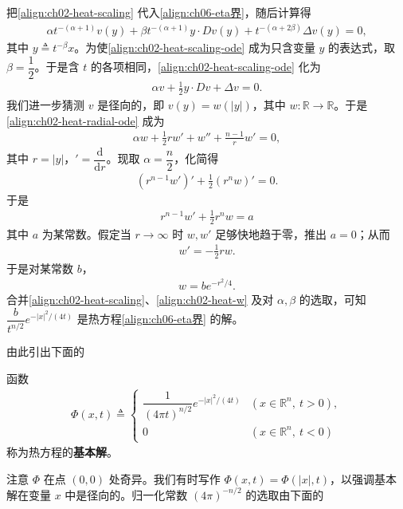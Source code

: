 \documentclass[../../main.tex]{subfiles}
\begin{document}
把\eqref{align:ch02-heat-scaling} 代入\eqref{align:ch06-eta界}，随后计算得
\begin{align}\label{align:ch02-heat-scaling-ode}
\alpha t^{-(\alpha+1)}v(y)+\beta t^{-(\alpha+1)}y\cdot Dv(y)+t^{-(\alpha+2\beta)}\Delta v(y)=0,
\end{align}
其中 $y\triangleq t^{-\beta}x$。为使\eqref{align:ch02-heat-scaling-ode} 成为只含变量 $y$ 的表达式，取 $\beta=\dfrac{1}{2}$。于是含 $t$ 的各项相同，\eqref{align:ch02-heat-scaling-ode} 化为
\begin{align}\label{align:ch02-heat-radial-ode}
\alpha v+\frac{1}{2}y\cdot Dv+\Delta v=0.
\end{align}
我们进一步猜测 $v$ 是径向的，即 $v(y)=w(|y|)$，其中 $w:\mathbb{R}\to\mathbb{R}$。于是\eqref{align:ch02-heat-radial-ode} 成为
\begin{align*}
\alpha w+\frac{1}{2}r w'+w''+\frac{n-1}{r}w'=0,
\end{align*}
其中 $r=|y|$，$'=\dfrac{\mathrm{d}}{\mathrm{d}r}$。现取 $\alpha=\dfrac{n}{2}$，化简得
\begin{align*}
(r^{n-1}w')'+\frac{1}{2}(r^n w)'=0.
\end{align*}
于是
\begin{align*}
r^{n-1}w'+\frac{1}{2}r^n w=a
\end{align*}
其中 $a$ 为某常数。假定当 $r\to\infty$ 时 $w,w'$ 足够快地趋于零，推出 $a=0$；从而
\begin{align*}
w'=-\frac{1}{2}rw.
\end{align*}
于是对某常数 $b$，
\begin{align}\label{align:ch02-heat-w}
w=b e^{-r^2/4}.
\end{align}
合并\eqref{align:ch02-heat-scaling}、\eqref{align:ch02-heat-w} 及对 $\alpha,\beta$ 的选取，可知 $\dfrac{b}{t^{n/2}}e^{-|x|^2/(4t)}$ 是热方程\eqref{align:ch06-eta界} 的解。

由此引出下面的

\begin{definition}\label{definition:ch02-heat-fundamental}
函数
\begin{align*}
\Phi(x,t)\triangleq
\begin{cases}
\dfrac{1}{(4\pi t)^{n/2}}e^{-|x|^2/(4t)} & (x\in\mathbb{R}^n,\ t>0),\\
0 & (x\in\mathbb{R}^n,\ t<0)
\end{cases}
\end{align*}
称为热方程的\textbf{基本解}。
\end{definition}

注意 $\Phi$ 在点 $(0,0)$ 处奇异。我们有时写作 $\Phi(x,t)=\Phi(|x|,t)$，以强调基本解在变量 $x$ 中是径向的。归一化常数 $(4\pi)^{-n/2}$ 的选取由下面的
\end{document}
